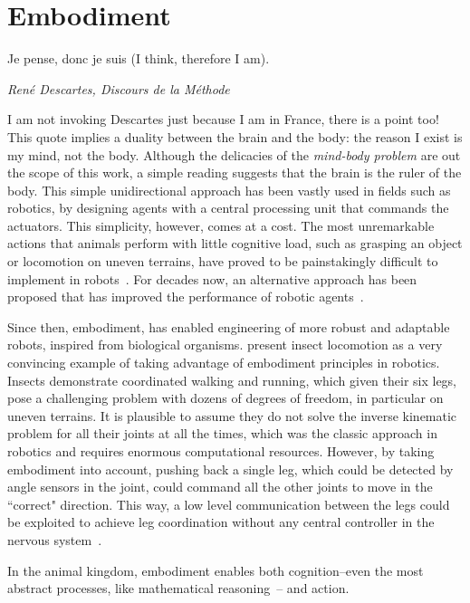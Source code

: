 \section{Embodiment}
\label{ch:intro:Embodiment}
\epigraph{Je pense, donc je suis (I think, therefore I am).}
{\textit{ Ren\'{e} Descartes, Discours de la M\'{e}thode}}
\noindent
I am not invoking Descartes just because I am in France, there is a point too!
This quote implies a duality between the brain and the body: the reason I exist is my mind, not the body.
Although the delicacies of the \emph{mind-body problem} are out the scope of this work, a simple reading suggests that the brain is the ruler of the body.
This simple unidirectional approach has been vastly used in fields such as robotics, by designing agents with a central processing unit that commands the actuators.
This simplicity, however, comes at a cost.
The most unremarkable actions that animals perform with little cognitive load, such as grasping an object or locomotion on uneven terrains, have proved to be painstakingly difficult to implement in robots~\cite{Pfeifer2006Book}.
For decades now, an alternative approach has been proposed that has improved the performance of robotic agents~\cite{Brooks1991AI}.
\par
Since then, embodiment\footnotemark, has enabled engineering of more robust and adaptable robots, inspired from biological organisms.
\citeauthor{Pfeifer2007Sci} present insect locomotion as a very convincing example of taking advantage of embodiment principles in robotics.
Insects demonstrate coordinated walking and running, which given their six legs, pose a challenging problem with dozens of degrees of freedom, in particular on uneven terrains.
It is plausible to assume they do not solve the inverse kinematic problem for all their joints at all the times, which was the classic approach in robotics and requires enormous computational resources.
However, by taking embodiment into account, pushing back a single leg, which could be detected by angle sensors in the joint, could command all the other joints to move in the ``correct" direction.
This way, a low level communication between the legs could be exploited to achieve leg coordination without any central controller in the nervous system~\cite{Pfeifer2007Sci}.
\par
In the animal kingdom, embodiment enables both cognition--even the most abstract processes, like mathematical reasoning~\cite{Lakoff2000Book}-- and action.
